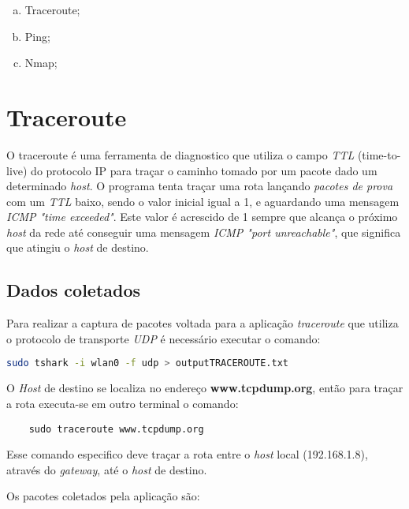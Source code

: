 \documentclass[a4paper]{report} %
\begin{document}
\begin{enumerate}[a)]
 \item Traceroute;
 \item Ping;
 \item Nmap;
\end{enumerate}

\section{Traceroute}
\label{sec_traceroute}
O traceroute é uma ferramenta de diagnostico que utiliza o campo \textit{TTL} (time-to-live) do protocolo IP para traçar o caminho tomado por um pacote dado um determinado \textit{host}. O programa tenta traçar uma rota lançando \textit{pacotes de prova} com um \textit{TTL} baixo, sendo o valor inicial igual a 1, e aguardando uma mensagem \textit{ICMP "time exceeded"}.  Este valor é acrescido de 1 sempre que alcança o próximo \textit{host} da rede até conseguir uma mensagem \textit{ICMP "port unreachable"}, que significa que atingiu o \textit{host} de destino. 
	
\subsection{Dados coletados}
\label{sub_traceroute_dados}
Para realizar a captura de pacotes voltada para a aplicação \textit{traceroute} que utiliza o protocolo de transporte \textit{UDP} é necessário executar o comando:
\begin{lstlisting}[language=bash]
	sudo tshark -i wlan0 -f udp > outputTRACEROUTE.txt
\end{lstlisting}

	O \textit{Host} de destino se localiza no endereço \textbf{www.tcpdump.org}, então para traçar a rota executa-se em outro terminal o comando:
	
\begin{lstlisting}
	sudo traceroute www.tcpdump.org
\end{lstlisting}
	
	Esse comando especifico deve traçar a rota entre o \textit{host} local (192.168.1.8), através do \textit{gateway}, até o \textit{host} de destino.

Os pacotes coletados pela aplicação são: 
\end{document}
